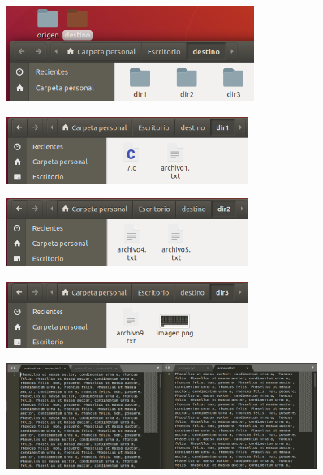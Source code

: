 \documentclass[12pt]{article}
\begin{document}
\begin{itemize}
			         \begin{figure}[h!]
			          \centering \includegraphics[width=0.72\textwidth]{Practica5/Images/linux/7_8.png}
			         \end{figure}
			         
			         \begin{figure}[h!]
			          \centering \includegraphics[width=0.7\textwidth]{Practica5/Images/linux/7_9.png}
			         \end{figure}
			         
			         \begin{figure}[h!]
			          \centering \includegraphics[width=0.7\textwidth]{Practica5/Images/linux/7_10.png}
			         \end{figure}
			         \begin{figure}[h!]
			          \centering \includegraphics[width=0.7\textwidth]{Practica5/Images/linux/7_11.png}
			         \end{figure}
			         
			         \begin{figure}[h!]
			          \centering \includegraphics[width=0.9\textwidth]{Practica5/Images/linux/7_12.png}
			         \end{figure}
			         

\end{itemize}
\end{document}
